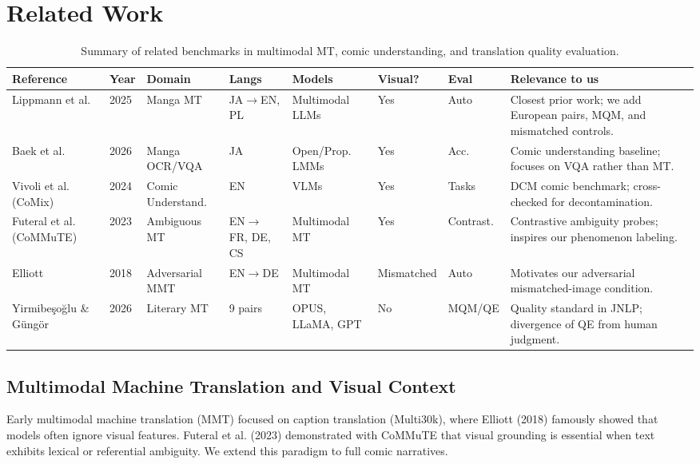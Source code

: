 \documentclass[11pt,a4paper]{article}
\begin{document}
\section{Related Work}

\begin{table}[h!]
\centering
\scriptsize
\begin{tabularx}{\textwidth}{p{2.2cm}lXllllX}
\toprule
\textbf{Reference} & \textbf{Year} & \textbf{Domain} & \textbf{Langs} & \textbf{Models} & \textbf{Visual?} & \textbf{Eval} & \textbf{Relevance to us} \\
\midrule
Lippmann et al. & 2025 & Manga MT & JA$\to$EN, PL & Multimodal LLMs & Yes & Auto & Closest prior work; we add European pairs, MQM, and mismatched controls. \\
Baek et al. & 2026 & Manga OCR/VQA & JA & Open/Prop. LMMs & Yes & Acc. & Comic understanding baseline; focuses on VQA rather than MT. \\
Vivoli et al. (CoMix) & 2024 & Comic Understand. & EN & VLMs & Yes & Tasks & DCM comic benchmark; cross-checked for decontamination. \\
Futeral et al. (CoMMuTE)& 2023 & Ambiguous MT & EN$\to$FR, DE, CS & Multimodal MT & Yes & Contrast. & Contrastive ambiguity probes; inspires our phenomenon labeling. \\
Elliott & 2018 & Adversarial MMT & EN$\to$DE & Multimodal MT & Mismatched & Auto & Motivates our adversarial mismatched-image condition. \\
Yirmibe\c{s}o\u{g}lu \& G\"ung\"or & 2026 & Literary MT & 9 pairs & OPUS, LLaMA, GPT & No & MQM/QE & Quality standard in JNLP; divergence of QE from human judgment. \\
\bottomrule
\end{tabularx}
\caption{Summary of related benchmarks in multimodal MT, comic understanding, and translation quality evaluation.}
\label{tab:related_work}
\end{table}

\subsection{Multimodal Machine Translation and Visual Context}
Early multimodal machine translation (MMT) focused on caption translation (Multi30k), where Elliott (2018) famously showed that models often ignore visual features. Futeral et al. (2023) demonstrated with CoMMuTE that visual grounding is essential when text exhibits lexical or referential ambiguity. We extend this paradigm to full comic narratives.
\end{document}
